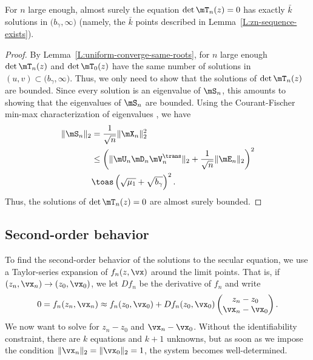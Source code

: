 \begin{lemma}\label{L:detT-solution-upper-bound}
    For $n$ large enough, almost surely
    the equation $\det \mT_n(z) = 0$ has exactly 
    $\bar k$ solutions in  $\big( b_\gamma, \infty \big)$
    (namely, the $\bar k$  points described in 
    Lemma~\ref{L:zn-sequence-exists}).
\end{lemma}
\begin{proof}
    By Lemma~\ref{L:uniform-converge-same-roots}, for $n$ large enough
    $\det \mT_n(z)$ and $\det \mT_0(z)$ have the same number of solutions in 
    $(u,v) \subset \big( b_\gamma, \infty \big)$.  Thus, we only need to
    show that the solutions of $\det \mT_n(z)$ are bounded.  Since every
    solution is an eigenvalue of $\mS_n$, this amounts to showing that the
    eigenvalues of $\mS_n$ are bounded.  Using the Courant-Fischer 
    min-max characterization of eigenvalues \cite{golub1996mc}, we have
    \begin{align*}
        \| \mS_n \|_2
            &= \frac{1}{\sqrt{n}} \| \mX_n \|_2^2 \\
            &\leq 
                \left(
                    \| \mU_n \mD_n \mV_n^\trans \|_2
                    +
                    \frac{1}{\sqrt{n}}
                    \| \mE_n \|_2
                \right)^2 \\
            &\toas
                \left( \sqrt{\mu_1} + \sqrt{b_\gamma} \right)^2.
    \end{align*}
    Thus, the solutions of $\det \mT_n(z) = 0$ are almost surely bounded.
\end{proof}


\subsection{Second-order behavior}

To find the second-order behavior of the solutions to the secular equation, we use a Taylor-series expansion of $f_n(z,\vx)$ around the limit points.  That is, if $(z_n, \vx_n) \to (z_0, \vx_0)$, we let $D f_n$ be the derivative of $f_n$ and write
\[
    0
    =
    f_n (z_n, \vx_n)
        \approx
        f_n( z_0, \vx_0 )
        + 
        D f_n(z_0, \vx_0)
        \left(
        \begin{matrix}
            z_n   - z_0 \\
            \vx_n - \vx_0
        \end{matrix}
        \right).
\]
We now want to solve for $z_n - z_0$ and $\vx_n - \vx_0$.  Without the identifiability constraint, there are $k$ equations and $k+1$ unknowns, but as soon as we impose the condition $\| \vx_n \|_2 = \| \vx_0 \|_2 = 1$, the
system becomes well-determined.

